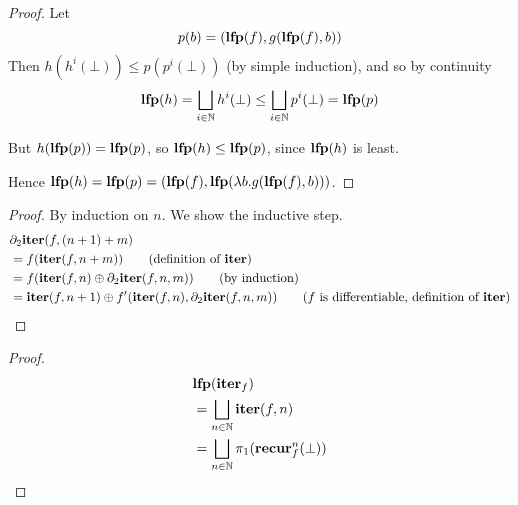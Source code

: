 \factoringFixpoints*
\begin{proof}
  \label{prf:factoringFixpoints}
  Let
  \begin{displaymath}
    p(b) = (\mathbf{lfp}(f), g(\mathbf{lfp}(f), b))
  \end{displaymath}
  Then $h(h^i(\bot)) \leq p(p^i(\bot))$ (by simple induction), and so by continuity
  \begin{displaymath}
    \mathbf{lfp}(h) = \bigsqcup_{i \in \mathbb{N}} h^i(\bot) \leq \bigsqcup_{i \in \mathbb{N}} p^i(\bot) = \mathbf{lfp}(p)
  \end{displaymath}

  But $h(\mathbf{lfp}(p)) = \mathbf{lfp}(p)$, so $\mathbf{lfp}(h) \leq \mathbf{lfp}(p)$, since $\mathbf{lfp}(h)$ is least.

  Hence $\mathbf{lfp}(h) = \mathbf{lfp}(p) = (\mathbf{lfp}(f), \mathbf{lfp}(\lambda b . g(\mathbf{lfp}(f), b)))$.
\end{proof}

\iterDerivativesN*
\begin{proof}
  \label{prf:iterDerivativesN}
  By induction on $n$. We show the inductive step.
  \begin{align*}
    &\partial_2\iter(f, (n+1) + m)\\
    &=f(\iter(f, n + m)) \tag{definition of $\iter$}\\
    &=f(\iter(f, n) \cplus \partial_2{\iter}(f, n, m)) \tag{by induction}\\
    &=\iter(f, n+1) \cplus \derive{f}(\iter(f, n), \partial_2{\iter}(f, n, m)) \tag{$f$ is differentiable, definition of $\iter$}
  \end{align*}
\end{proof}

\fixpointIter*
\begin{proof}
  \label{prf:fixpointIter}
  \begin{align*}
    &\mathbf{lfp}(\mathbf{iter}_f)\\
    &=\bigsqcup_{n \in \mathbb{N}} \mathbf{iter}(f, n)\\
    &=\bigsqcup_{n \in \mathbb{N}} \pi_1 (\mathbf{recur}_f^n(\bot))
  \end{align*}
\end{proof}

